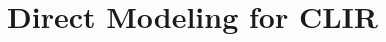 \documentclass[11pt,a4paper]{article}
\begin{document}


\section{Direct Modeling for CLIR}
\end{document}
